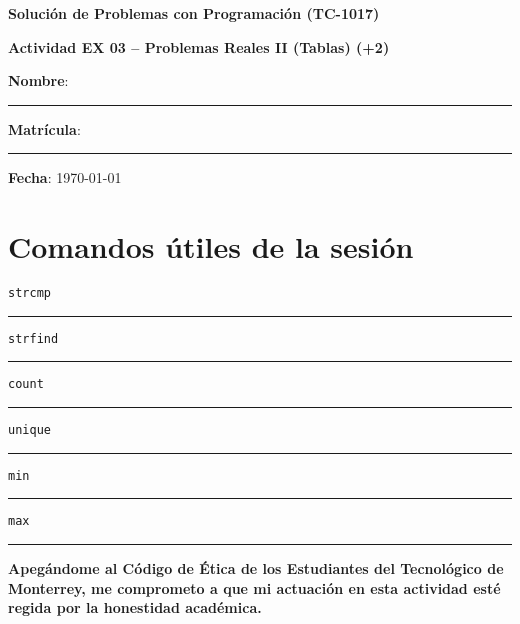 \documentclass[spanish, 10pt]{article}
\newcommand{\responserule}{{\large\rule{14 cm}{0.3mm}}}
\newcommand{\matlab}[1]{\lstinline[style=Matlab-pyglike]!#1!}
\begin{document}
\begin{center}
	{\Large \textbf{Solución de Problemas con Programación (TC-1017)}}
	
	\bigskip
	{\large \textbf{Actividad EX 03 -- Problemas Reales II (Tablas) (+2)}}
\end{center}

\bigskip
{\large \textbf{Nombre}: \rule{13.7 cm}{0.4mm}}



\bigskip
{\large \textbf{Matrícula}: \rule{5 cm}{0.4mm}} \hfill {\large \textbf{Fecha}: \today}

\bigskip


\section*{Comandos útiles de la sesión}

\matlab{strcmp} \hfill \\[1.5ex]
\responserule

\bigskip

\matlab{strfind} \hfill \\[1.5ex]
\responserule

\bigskip

\matlab{count} \hfill \\[1.5ex]
\responserule

\bigskip

\matlab{unique} \hfill \\[1.5ex]
\responserule

\bigskip

\matlab{min} \hfill \\[1.5ex]
\responserule

\bigskip

\matlab{max} \hfill \\[1.5ex]
\responserule

\vfill

\textbf{Apegándome al Código de Ética de los Estudiantes del Tecnológico de Monterrey, me comprometo a que mi actuación en esta actividad esté regida por la honestidad académica.}
\end{document}
